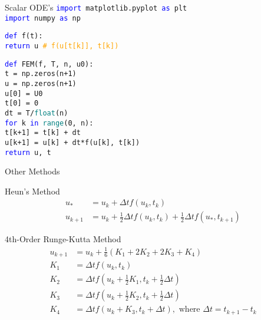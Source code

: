 \documentclass{beamer}
\begin{document}
\begin{frame}[t]{Scalar ODE's}
\footnotesize 
\texttt{\textcolor{blue}{import} matplotlib.pyplot \textcolor{blue}{as} plt}\\
\texttt{\textcolor{blue}{import} numpy \textcolor{blue}{as} np}

\texttt{\textcolor{blue}{def} f(t):}\\
\texttt{\quad \quad \textcolor{blue}{return} u \textcolor{orange}{\# f(u[t[k]], t[k])}}

\texttt{\textcolor{blue}{def} FEM(f, T, n, u0):}\\
\texttt{\quad \quad t = np.zeros(n+1)}\\
\texttt{\quad \quad u = np.zeros(n+1)}\\
\texttt{\quad \quad u[0] = U0}\\
\texttt{\quad \quad t[0] = 0}\\
\texttt{\quad \quad dt = T/\textcolor{teal}{float}(n)}\\
\texttt{\quad \quad \textcolor{blue}{for} k \textcolor{blue}{in} \textcolor{teal}{range}(0, n):}\\
\texttt{\quad \quad \quad \quad t[k+1] = t[k] + dt}\\
\texttt{\quad \quad \quad \quad u[k+1] = u[k] + dt*f(u[k], t[k])}\\
\texttt{\quad \quad \textcolor{blue}{return} u, t}\\
\href{https://www.youtube.com/watch?v=KrFvH1UrbPs}{}
\end{frame}

\begin{frame}[t]{Other Methods}
\begin{block}{Heun's Method}
\vspace{-15pt}
\begin{align*}
u_* &= u_k + \Delta tf(u_k, t_k)\\
u_{k+1} &= u_k + \frac{1}{2}\Delta tf(u_k, t_k) + \frac{1}{2}\Delta tf(u_*, t_{k+1})
\end{align*}
\vspace{-15pt}
\end{block}
\pause \begin{block}{4th-Order Runge-Kutta Method}
\vspace{-12pt}
\begin{align*}
u_{k+1} &= u_k + \frac{1}{6}\left(K_1 + 2K_2 + 2K_3 + K_4\right)\\
K_1 &= \Delta tf(u_k, t_k)\\
K_2 &= \Delta tf\left(u_k + \frac{1}{2}K_1, t_k + \frac{1}{2}\Delta t\right)\\
K_3 &= \Delta tf\left(u_k + \frac{1}{2}K_2, t_k + \frac{1}{2}\Delta t\right)\\
K_4 &= \Delta tf(u_k + K_3, t_k + \Delta t),\text{ where } \Delta t = t_{k+1} - t_k
\end{align*}
\vspace{-22pt}
\end{block}
\end{frame}
\end{document}
